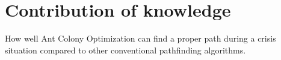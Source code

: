 \chapter{Contribution of knowledge}
\label{ch:contribution}


How well Ant Colony Optimization can find a proper path during a crisis situation compared to other conventional pathfinding algorithms. 